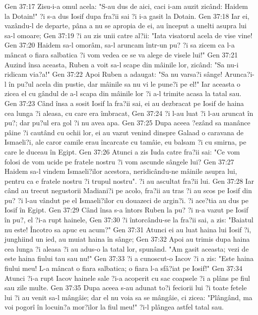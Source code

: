 Gen 37:17  Zisu-i-a omul acela: "S-au dus de aici, caci i-am auzit zicând: Haidem la Dotain!" ?i s-a dus Iosif dupa fra?ii sai ?i i-a gasit la Dotain.
Gen 37:18  Iar ei, vazându-l de departe, pâna a nu se apropia de ei, au început a unelti asupra lui sa-l omoare;
Gen 37:19  ?i au zis unii catre al?ii: "Iata visatorul acela de vise vine!
Gen 37:20  Haidem sa-l omorâm, sa-l aruncam într-un pu? ?i sa zicem ca l-a mâncat o fiara salbatica ?i vom vedea ce se va alege de visele lui!"
Gen 37:21  Auzind însa aceasta, Ruben a voit sa-l scape din mâinile lor, zicând: "Sa nu-i ridicam via?a!"
Gen 37:22  Apoi Ruben a adaugat: "Sa nu varsa?i sânge! Arunca?i-l în pu?ul acela din pustie, dar mâinile sa nu vi le pune?i pe el!" Iar aceasta o zicea el cu gândul de a-l scapa din mâinile lor ?i a-l trimite acasa la tatal sau.
Gen 37:23  Când însa a sosit Iosif la fra?ii sai, ei au dezbracat pe Iosif de haina cea lunga ?i aleasa, cu care era îmbracat,
Gen 37:24  ?i l-au luat ?i l-au aruncat în pu?; dar pu?ul era gol ?i nu avea apa.
Gen 37:25  Dupa aceea ?ezând sa manânce pâine ?i cautând cu ochii lor, ei au vazut venind dinspre Galaad o caravana de Ismaeli?i, ale caror camile erau încarcate cu tamâie, eu balsam ?i cu smirna, pe care le duceau în Egipt.
Gen 37:26  Atunci a zis Iuda catre fra?ii sai: "Ce vom folosi de vom ucide pe fratele nostru ?i vom ascunde sângele lui?
Gen 37:27  Haidem sa-l vindem Ismaeli?ilor acestora, neridicându-ne mâinile asupra lui, pentru ca e fratele nostru ?i trupul nostru". ?i au ascultat fra?ii lui.
Gen 37:28  Iar când au trecut negustorii Madiani?i pe acolo, fra?ii au tras ?i au scos pe Iosif din pu? ?i l-au vândut pe el Ismaeli?ilor cu douazeci de argin?i. ?i ace?tia au dus pe Iosif în Egipt.
Gen 37:29  Când însa s-a întors Ruben la pu? ?i n-a vazut pe Iosif în pu?, el ?i-a rupt hainele,
Gen 37:30  ?i întorcându-se la fra?ii sai, a zis: "Baiatul nu este! Încotro sa apuc eu acum?"
Gen 37:31  Atunci ei au luat haina lui Iosif ?i, junghiind un ied, au muiat haina în sânge;
Gen 37:32  Apoi au trimis dupa haina cea lunga ?i aleasa ?i au adus-o la tatal lor, spunând. "Am gasit aceasta; vezi de este haina fiului tau sau nu!"
Gen 37:33  ?i a cunoscut-o Iacov ?i a zis: "Este haina fiului meu! L-a mâncat o fiara salbatica; o fiara l-a sfâ?iat pe Iosif!"
Gen 37:34  Atunci ?i-a rupt Iacov hainele sale ?i-a acoperit cu sac coapsele ?i a plâns pe fiul sau zile multe.
Gen 37:35  Dupa aceea s-au adunat to?i feciorii lui ?i toate fetele lui ?i au venit sa-l mângâie; dar el nu voia sa se mângâie, ci zicea: "Plângând, ma voi pogorî în locuin?a mor?ilor la fiul meu!" ?i-l plângea astfel tatal sau.
